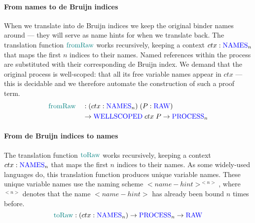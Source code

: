 \paragraph*{From names to de Bruijn indices}
When we translate into de Bruijn indices we keep the original binder names around --- they will serve as name hints for when we translate back.
The translation function $\textcolor{teal}{\operatorname{fromRaw}}$ works recursively, keeping a context $ctx : \textcolor{blue}{\operatorname{NAMES}}_n$ that maps the first $n$ indices to their names.
Named references within the process are substituted with their corresponding de Bruijn index.
We demand that the original process is well-scoped: that all its free variable names appear in $ctx$ --- this is decidable and we therefore automate the construction of such a proof term.
\begin{alignat*}{2}
    &\textcolor{teal}{\operatorname{fromRaw}} && : (ctx : \textcolor{blue}{\operatorname{NAMES}}_n) \; (P : \textcolor{blue}{\operatorname{RAW}}) \\
    &               && \to \textcolor{blue}{\operatorname{WELLSCOPED}} \; ctx \; P \to \textcolor{blue}{\operatorname{PROCESS}}_n
\end{alignat*}

\paragraph*{From de Bruijn indices to names}
The translation function $\textcolor{teal}{\operatorname{toRaw}}$ works recursively, keeping a context $ctx : \textcolor{blue}{\operatorname{NAMES}}_n$ that maps the first $n$ indices to their names.
As some widely-used languages do, this translation function produces unique variable names.
These unique variable names use the naming scheme $<name-hint>^{<n>}$, where $^{<n>}$ denotes that the name $<name-hint>$ has already been bound $n$ times before.
\begin{equation*}
    \textcolor{teal}{\operatorname{toRaw}} : (ctx : \textcolor{blue}{\operatorname{NAMES}}_n) \to \textcolor{blue}{\operatorname{PROCESS}}_n \to \textcolor{blue}{\operatorname{RAW}}
\end{equation*}


